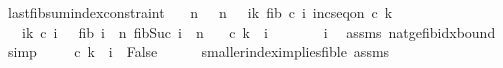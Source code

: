 \begin{isabellebody}
\ last{\isacharunderscore}{\kern0pt}fib{\isacharunderscore}{\kern0pt}sum{\isacharunderscore}{\kern0pt}index{\isacharunderscore}{\kern0pt}constraint{\isacharcolon}{\kern0pt}\isanewline
\ \ \ {\isachardoublequoteopen}n\ {\isasymge}\ {}{\isachardoublequoteclose}\ {\isachardoublequoteopen}n\ {\isacharequal}{\kern0pt}\ {\isacharparenleft}{\kern0pt}{\isasymSum}\ i{\isacharequal}{\kern0pt}{}{\isachardot}{\kern0pt}{\isachardot}{\kern0pt}k{\isachardot}{\kern0pt}\ fib\ {\isacharparenleft}{\kern0pt}c\ i{\isacharparenright}{\kern0pt}{\isacharparenright}{\kern0pt}{\isachardoublequoteclose}\ {\isachardoublequoteopen}inc{\isacharunderscore}{\kern0pt}seq{\isacharunderscore}{\kern0pt}on\ c\ {\isacharbraceleft}{\kern0pt}{}{\isachardot}{\kern0pt}{\isachardot}{\kern0pt}k{\isacharminus}{\kern0pt}{}{\isacharbraceright}{\kern0pt}{\isachardoublequoteclose}\ \isanewline
\ \ \ {\isachardoublequoteopen}{\isasymforall}i{\isasymin}{\isacharbraceleft}{\kern0pt}{}{\isachardot}{\kern0pt}{\isachardot}{\kern0pt}k{\isacharbraceright}{\kern0pt}{\isachardot}{\kern0pt}\ c\ i\ {\isasymge}\ {}{\isachardoublequoteclose}\ {\isachardoublequoteopen}fib\ i\ {\isasymle}\ n{\isachardoublequoteclose}\ {\isachardoublequoteopen}fib{\isacharparenleft}{\kern0pt}Suc\ i{\isacharparenright}{\kern0pt}\ {\isachargreater}{\kern0pt}\ n{\isachardoublequoteclose}\isanewline
\ \ \ {\isachardoublequoteopen}c\ k\ {\isacharequal}{\kern0pt}\ i{\isachardoublequoteclose}\isanewline
%
\isadelimproof
%
\endisadelimproof
%
\isatagproof
{}\isamarkupfalse%
\ {\isacharminus}{\kern0pt}\isanewline
\ \ \isamarkupfalse%
\ {\isachardoublequoteopen}{}\ {\isasymle}\ i{\isachardoublequoteclose}\ \isamarkupfalse%
\ assms{\isacharparenleft}{\kern0pt}{}{\isacharcomma}{\kern0pt}{}{\isacharcomma}{\kern0pt}{}{\isacharparenright}{\kern0pt}\ nat{\isacharunderscore}{\kern0pt}ge{\isacharunderscore}{\kern0pt}{}{\isacharunderscore}{\kern0pt}fib{\isacharunderscore}{\kern0pt}idx{\isacharunderscore}{\kern0pt}bound\ \isamarkupfalse%
\ simp\ \isanewline
\ \ \isamarkupfalse%
\ {\isachardoublequoteopen}c\ k\ {\isachargreater}{\kern0pt}\ i\ {\isasymlongrightarrow}\ False{\isachardoublequoteclose}\isanewline
\ \ \ \ \isamarkupfalse%
\ smaller{\isacharunderscore}{\kern0pt}index{\isacharunderscore}{\kern0pt}implies{\isacharunderscore}{\kern0pt}fib{\isacharunderscore}{\kern0pt}le\ assms\ \isanewline

\end{isabellebody}
